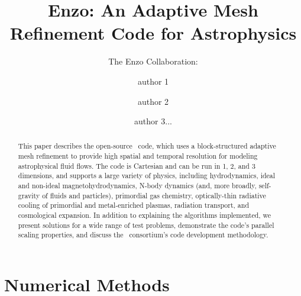 \documentclass[onecolumn,iop]{emulateapj}  %
\begin{document}
\title{Enzo: An Adaptive Mesh Refinement Code for Astrophysics}
\author{The Enzo Collaboration:}
\author{author 1}
\author{author 2}
\author{author 3...}


\begin{abstract}
This paper describes the open-source \enzo\ code, which uses a
block-structured adaptive mesh refinement to provide high spatial and
temporal resolution for modeling astrophysical fluid flows.  The code
is Cartesian and can be run in 1, 2, and 3 dimensions, and supports a
large variety of physics, including hydrodynamics, ideal and non-ideal
magnetohydrodynamics, N-body dynamics (and, more broadly, self-gravity
of fluids and particles), primordial gas chemistry, optically-thin
radiative cooling of primordial and metal-enriched plasmas, radiation
transport, and cosmological expansion.  In addition to explaining the
algorithms implemented, we present solutions for a wide range of test
problems, demonstrate the code's parallel scaling properties, and
discuss the \enzo\ consortium's code development methodology.
\end{abstract}


\maketitle





\section{Numerical Methods}
\label{sec.methods}
\end{document}
